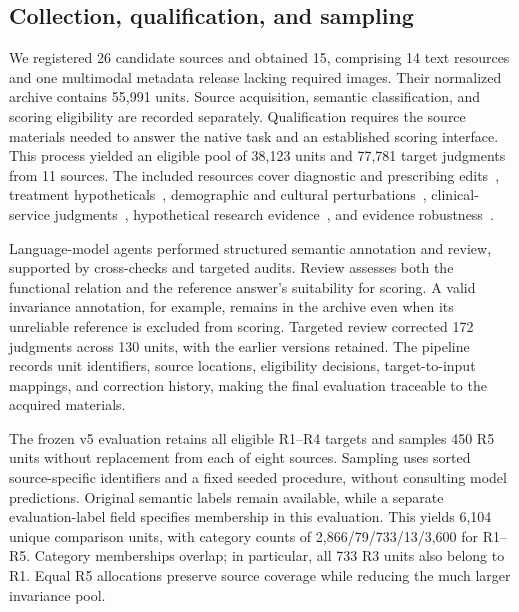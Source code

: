 \subsection{Collection, qualification, and sampling}

We registered 26 candidate sources and obtained 15, comprising 14 text resources and one multimodal metadata release lacking required images. Their normalized archive contains 55,991 units. Source acquisition, semantic classification, and scoring eligibility are recorded separately. Qualification requires the source materials needed to answer the native task and an established scoring interface. This process yielded an eligible pool of 38,123 units and 77,781 target judgments from 11 sources. The included resources cover diagnostic and prescribing edits~\cite{chen2026medeinst,medpicbench}, treatment hypotheticals~\cite{prosperi2026hiv}, demographic and cultural perturbations~\cite{benkirane2025bias,rezaei2026cultural,xiao2025amqa,rawat2024diversitymedqa}, clinical-service judgments~\cite{gourabathina2025medperturb}, hypothetical research evidence~\cite{mo2026faithfulness}, and evidence robustness~\cite{ngo2024medrgb,li2025biorab}.

Language-model agents performed structured semantic annotation and review, supported by cross-checks and targeted audits. Review assesses both the functional relation and the reference answer's suitability for scoring. A valid invariance annotation, for example, remains in the archive even when its unreliable reference is excluded from scoring. Targeted review corrected 172 judgments across 130 units, with the earlier versions retained. The pipeline records unit identifiers, source locations, eligibility decisions, target-to-input mappings, and correction history, making the final evaluation traceable to the acquired materials.

The frozen v5 evaluation retains all eligible R1--R4 targets and samples 450 R5 units without replacement from each of eight sources. Sampling uses sorted source-specific identifiers and a fixed seeded procedure, without consulting model predictions. Original semantic labels remain available, while a separate evaluation-label field specifies membership in this evaluation. This yields 6,104 unique comparison units, with category counts of 2,866/79/733/13/3,600 for R1--R5. Category memberships overlap; in particular, all 733 R3 units also belong to R1. Equal R5 allocations preserve source coverage while reducing the much larger invariance pool.

